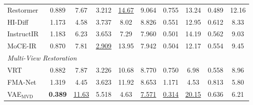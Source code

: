 \documentclass{llmxive}
\begin{document}
\begin{table}[h]
{\begin{tabular}{lccccccccc}

Restormer~\cite{zamir2022restormer}
&   0.889    &       7.67
&   3.212    &       \underline{14.67}
&   9.064
&   0.755   &       13.24
&   0.489   &       12.16
\\



HI-Diff~\cite{chen2023hierarchical}
&   1.173    &       4.58
&   3.737     &      8.02
&   8.826
&   0.551   &       12.95
&   0.612    &      8.33
\\


InstructIR~\cite{conde2024high}
&  1.183     &     6.23
&  3.653    &      7.29
&  7.960
&  0.501     &     14.19
&  0.562    &      9.03
\\

MoCE-IR~\cite{zamfir2024complexityexperts}
&   0.870   &      7.81
&   \underline{2.909}    &     13.95
&   7.942   
&   0.504    &     12.17
&   0.554   &      9.45 
\\


\midrule

\multicolumn{10}{l}{\textit{Multi-View Restoration}} \\
\midrule

VRT~\cite{liang2024vrt}
&    0.882   &     7.87  
&    3.226   &     10.68 
&    8.770  
&    0.750   &     6.98
&    0.558   &     8.96  
\\


FMA-Net~\cite{Youk_2024_CVPR}
&   1.319    &   4.45
&   3.623    &   11.92
&   8.653    
&   1.171    &   4.53
&   0.813    &   5.80
\\


VAE$_\text{MVD}$
&   \textbf{0.389}    &     \underline{11.63}
&   5.518    &     4.63
&   \underline{7.571}
&   \underline{0.314}    &    \underline{20.15}
&   0.636    &    6.21
\\




\end{tabular}}
\end{table}
\end{document}
